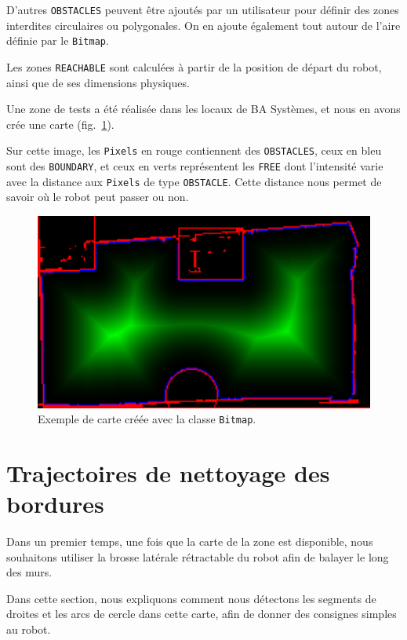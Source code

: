 \documentclass[french,A4paper,]{book}
\begin{document}
D'autres \texttt{OBSTACLES} peuvent être ajoutés par un utilisateur pour
définir des zones interdites circulaires ou polygonales. On en ajoute
également tout autour de l'aire définie par le \texttt{Bitmap}.

Les zones \texttt{REACHABLE} sont calculées à partir de la position de
départ du robot, ainsi que de ses dimensions physiques.

Une zone de tests a été réalisée dans les locaux de BA Systèmes, et nous
en avons crée une carte (fig.~\ref{fig:carte}).

Sur cette image, les \texttt{Pixels} en rouge contiennent des
\texttt{OBSTACLES}, ceux en bleu sont des \texttt{BOUNDARY}, et ceux en
verts représentent les \texttt{FREE} dont l'intensité varie avec la
distance aux \texttt{Pixels} de type \texttt{OBSTACLE}. Cette distance
nous permet de savoir où le robot peut passer ou non.

\begin{figure}
\centering
\includegraphics[width=1.00000\textwidth]{imgs/carte.png}
\caption{Exemple de carte créée avec la classe
\texttt{Bitmap}.}\label{fig:carte}
\end{figure}

\section{Trajectoires de nettoyage des bordures}\label{sec:bordures}

Dans un premier temps, une fois que la carte de la zone est disponible,
nous souhaitons utiliser la brosse latérale rétractable du robot afin de
balayer le long des murs.

Dans cette section, nous expliquons comment nous détectons les segments
de droites et les arcs de cercle dans cette carte, afin de donner des
consignes simples au robot.
\end{document}
